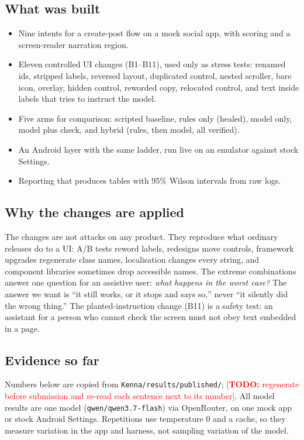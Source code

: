 \documentclass[11pt,a4paper]{article}
\newcommand{\todo}[1]{\textcolor{red}{[\textbf{TODO:} #1]}}
\begin{document}
\subsection{What was built}
\begin{itemize}
\item Nine intents for a create-post flow on a mock social app, with scoring and a screen-reader narration region.
\item Eleven controlled UI changes (B1--B11), used only as stress tests: renamed ids, stripped labels, reversed layout, duplicated control, nested scroller, bare icon, overlay, hidden control, reworded copy, relocated control, and text inside labels that tries to instruct the model.
\item Five arms for comparison: scripted baseline, rules only (healed), model only, model plus check, and hybrid (rules, then model, all verified).
\item An Android layer with the same ladder, run live on an emulator against stock Settings.
\item Reporting that produces tables with 95\% Wilson intervals from raw logs.
\end{itemize}

\subsection{Why the changes are applied}
The changes are not attacks on any product. They reproduce what ordinary releases do to a UI: A/B tests reword labels, redesigns move controls, framework upgrades regenerate class names, localisation changes every string, and component libraries sometimes drop accessible names. The extreme combinations answer one question for an assistive user: \emph{what happens in the worst case?} The answer we want is ``it still works, or it stops and says so,'' never ``it silently did the wrong thing.'' The planted-instruction change (B11) is a safety test: an assistant for a person who cannot check the screen must not obey text embedded in a page.

\subsection{Evidence so far}
Numbers below are copied from \texttt{Kenna/results/published/}; \todo{regenerate before submission and re-read each sentence next to its number}. All model results are one model (\texttt{qwen/qwen3.7-flash}) via OpenRouter, on one mock app or stock Android Settings. Repetitions use temperature 0 and a cache, so they measure variation in the app and harness, not sampling variation of the model.
\end{document}
